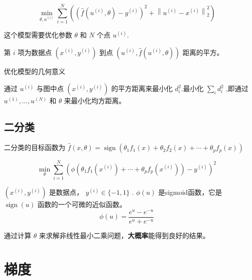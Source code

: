 \begin{problem}
    \begin{equation}
\min _{\theta, u^{(i)}} \sum_{i=1}^{N}\left(\left(\hat{f}\left(u^{(i)}, \theta\right)-y^{(i)}\right)^{2}+\left\|u^{(i)}-x^{(i)}\right\|_{2}^{2}\right)
\end{equation}

这个模型需要优化参数 $ \theta $ 和 $ {N} $ 个点 $ u^{(i)} $.
\end{problem}

第 $ i $ 项为数据点 $ \left(x^{(i)}, y^{(i)}\right) $ 到点 $ \left(u^{(i)}, \hat{f}\left(u^{(i)}, \theta\right)\right) $ 距离的平方。

\begin{FigureCenter}{优化模型的几何意义}
    
\end{FigureCenter}

通过 $ u^{(i)} $ 与图中点 $ \left(x^{(i)}, y^{(i)}\right) $ 的平方距离来最小化 $ d_{i}^{2} $.最小化 $ \sum_{i} d_{i}^{2} $ ,即通过 $ u^{(1)}, \ldots, u^{(N)} $ 和 $ \theta $ 来最小化均方距离。

\subsection{二分类}

二分类的目标函数为 $ \hat{f}(x, \theta)=\operatorname{sign}\left(\theta_{1} f_{1}(x)+\theta_{2} f_{2}(x)+\cdots+\theta_{p} f_{p}(x)\right) $ 


\begin{problem}[二分类问题]
    \begin{equation}
\min _{\theta} \sum_{i=1}^{N}\left(\phi\left(\theta_{1} f_{1}\left(x^{(i)}\right)+\cdots+\theta_{p} f_{p}\left(x^{(i)}\right)\right)-y^{(i)}\right)^{2}
\end{equation}

$ \left(x^{(i)}, y^{(i)}\right) $ 是数据点， $ y^{(i)} \in\{-1,1\} $ . $ \phi(u) $ 是sigmoid函数，它是 $\operatorname{sign} (u) $ 函数的一个可微的近似函数。
\begin{equation}
\phi(u)=\frac{e^{u}-e^{-u}}{e^{u}+e^{-u}}
\end{equation}
\end{problem}


通过计算 $ \theta $ 来求解非线性最小二乘问题，\textbf{大概率}能得到良好的结果。



\section{梯度}

